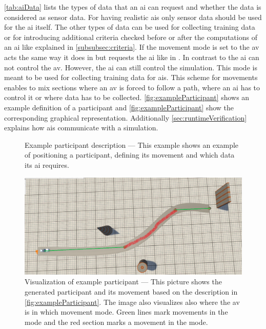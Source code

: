 \autoref{tab:aiData} lists the types of data that an \gls{ai} can request and whether the data is considered as sensor data.
For having realistic \glspl{ai} only sensor data should be used for the \gls{ai} itself.
The other types of data can be used for collecting training data or for introducing additional criteria checked before or after the computations of an \gls{ai} like explained in \autoref{subsubsec:criteria}.
If the movement mode is set to \iltraining{} the \gls{av} acts the same way it does in \ilmanual{} but requests the \gls{ai} like in \ilautonomous{}.
In contrast to \ilautonomous{} the \gls{ai} can not control the \gls{av}.
However, the \gls{ai} can still control the simulation.
This mode is meant to be used for collecting training data for \glspl{ai}.
This scheme for movements enables to mix sections where an \gls{av} is forced to follow a path, where an \gls{ai} has to control it or where data has to be collected.
\autoref{fig:exampleParticipant} shows an example definition of a participant and \autoref{fig:exampleParticipant} show the corresponding graphical representation.
Additionally \autoref{sec:runtimeVerification} explains how \glspl{ai} communicate with a simulation.
\begin{figure}
    \caption{Example participant description --- This example shows an example of positioning a participant, defining its movement and which data its \gls{ai} requires.}\label{fig:exampleParticipant}
    \medskip
    
\end{figure}
\begin{figure}
    \caption{%
        Visualization of example participant --- This picture shows the generated participant and its movement based on the description in \autoref{fig:exampleParticipant}.
        The image also visualizes also where the \gls{av} is in which movement mode.
        Green lines mark movements in the \ilmanual{} mode and the red section marks  a movement in the \ilautonomous{} mode.
    }\label{fig:exampleParticipantVis}
    \medskip
    \includegraphics[width=\linewidth]{pictures/2019-06-05_ParticipantMovement.png}
\end{figure}
